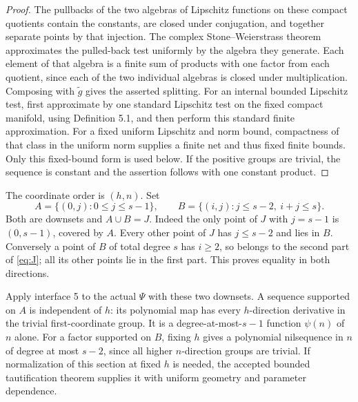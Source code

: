 \documentclass[11pt]{article}
\begin{document}
\begin{proof}
The pullbacks of the two algebras of Lipschitz functions on these compact
quotients contain the constants, are closed under conjugation, and
together separate points by that injection. The complex
Stone--Weierstrass theorem approximates the pulled-back test uniformly
by the algebra they generate. Each element of that algebra is a finite
sum of products with one factor from each quotient, since each of the
two individual algebras is closed under multiplication. Composing with
$\widetilde g$ gives the asserted splitting. For an internal bounded
Lipschitz test, first approximate by one standard Lipschitz test on the
fixed compact manifold, using Definition 5.1, and then perform this
standard finite approximation. For a fixed uniform Lipschitz and norm
bound, compactness of that class in the uniform norm supplies a finite
net and thus fixed finite bounds. Only this fixed-bound form is used
below. If the positive groups are trivial, the sequence is constant and
the assertion follows with one constant product.
\end{proof}

The coordinate order is $(h,n)$. Set
\[
 A=\{(0,j):0\leq j\leq s-1\},\qquad
 B=\{(i,j):j\leq s-2,\ i+j\leq s\}.
\]
Both are downsets and $A\cup B=J$. Indeed the only point of $J$ with
$j=s-1$ is $(0,s-1)$, covered by $A$. Every other point of $J$ has
$j\leq s-2$ and lies in $B$. Conversely a point of $B$ of total degree
$s$ has $i\geq2$, so belongs to the second part of \eqref{eq:J}; all its
other points lie in the first part. This proves equality in both directions.

Apply interface 5 to the actual $\Psi$ with these two downsets. A sequence
supported on $A$ is independent of $h$: its polynomial map has every
$h$-direction derivative in the trivial first-coordinate group.
It is a degree-at-most-$s-1$ function $\psi(n)$ of $n$ alone.
For a factor supported on $B$, fixing $h$ gives a polynomial nilsequence
in $n$ of degree at most $s-2$, since all higher $n$-direction groups are
trivial. If normalization of this section at fixed $h$ is needed, the
accepted bounded tautification theorem supplies it with uniform geometry
and parameter dependence.
\end{document}
